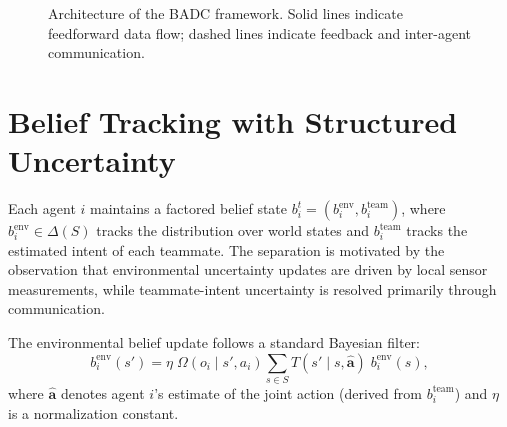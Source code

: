 \documentclass[12pt,oneside]{report}
\theoremstyle{definition}
\theoremstyle{remark}
\begin{document}
\begin{figure}[htbp]
\centering
{}
\caption{Architecture of the BADC framework. Solid lines indicate feedforward
data flow; dashed lines indicate feedback and inter-agent communication.}
\label{fig:badc-arch}
\end{figure}

\section{Belief Tracking with Structured Uncertainty}
\label{sec:badc-structure}

Each agent $i$ maintains a factored belief state $b_i^t = (b_i^{\text{env}}, b_i^{\text{team}})$,
where $b_i^{\text{env}} \in \Delta(S)$ tracks the distribution over world states
and $b_i^{\text{team}}$ tracks the estimated intent of each teammate. The
separation is motivated by the observation that environmental uncertainty updates
are driven by local sensor measurements, while teammate-intent uncertainty is
resolved primarily through communication.

The environmental belief update follows a standard Bayesian filter:
\begin{equation}
  b_i^{\text{env}}(s') = \eta \; \Omega(o_i \mid s', a_i) \sum_{s \in S} T(s' \mid s, \mathbf{\hat{a}}) \; b_i^{\text{env}}(s),
  \label{eq:bayes}
\end{equation}
where $\mathbf{\hat{a}}$ denotes agent $i$'s estimate of the joint action
(derived from $b_i^{\text{team}}$) and $\eta$ is a normalization constant.
\end{document}
